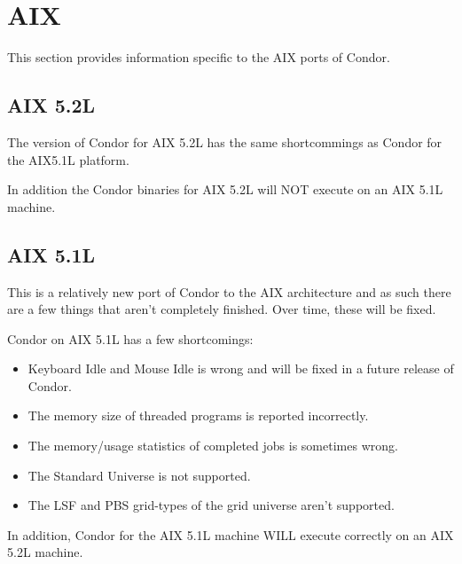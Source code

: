 \section{\label{sec:platform-aix}AIX}

This section provides information specific to the AIX ports of
Condor.

\subsection{\label{sec:platform-aix}AIX 5.2L}

The version of Condor for AIX 5.2L has the same shortcommings as Condor
for the AIX5.1L platform.

In addition the Condor binaries for AIX 5.2L will NOT execute on an
AIX 5.1L machine.

\subsection{\label{sec:platform-aix}AIX 5.1L}

This is a relatively new port of Condor to the AIX architecture and as such
there are a few things that aren't completely finished. Over time, these will
be fixed.

Condor on AIX 5.1L has a few shortcomings:
\begin{itemize}
\item Keyboard Idle and Mouse Idle is wrong and will be fixed in a future
	release of Condor.
\item The memory size of threaded programs is reported incorrectly.
\item The memory/usage statistics of completed jobs is sometimes wrong.
\item The Standard Universe is not supported.
\item The LSF and PBS grid-types of the grid universe aren't supported.
\end{itemize}

In addition, Condor for the AIX 5.1L machine WILL execute correctly on an
AIX 5.2L machine.


